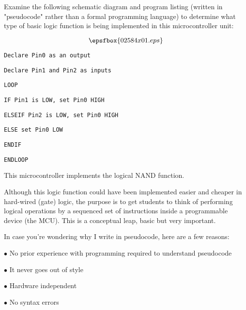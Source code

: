 

Examine the following schematic diagram and program listing (written in "pseudocode" rather than a formal programming language) to determine what type of basic logic function is being implemented in this microcontroller unit:

$$\epsfbox{02584x01.eps}$$

\noindent
{}

{\tt Declare Pin0 as an output}

{\tt Declare Pin1 and Pin2 as inputs}

{\tt LOOP}

\hskip 10pt {\tt IF Pin1 is LOW, set Pin0 HIGH}

\hskip 10pt {\tt ELSEIF Pin2 is LOW, set Pin0 HIGH}

\hskip 10pt {\tt ELSE set Pin0 LOW}

\hskip 10pt {\tt ENDIF}

{\tt ENDLOOP}

\vskip 10pt







This microcontroller implements the logical NAND function.







Although this logic function could have been implemented easier and cheaper in hard-wired (gate) logic, the purpose is to get students to think of performing logical operations by a sequenced set of instructions inside a programmable device (the MCU).  This is a conceptual leap, basic but very important.

\vskip 10pt

In case you're wondering why I write in pseudocode, here are a few reasons:

\medskip
\goodbreak
\item{$\bullet$} No prior experience with programming required to understand pseudocode
\item{$\bullet$} It never goes out of style
\item{$\bullet$} Hardware independent
\item{$\bullet$} No syntax errors
\medskip

